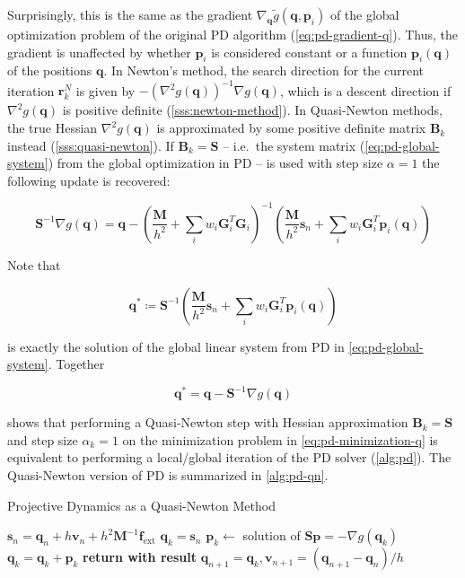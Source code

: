 Surprisingly, this is the same as the gradient $\nabla_{\bm{q}} \tilde{g}(\bm{q}, \bm{p}_i)$ of the global optimization problem of the original
PD algorithm (\cref{eq:pd-gradient-q}). Thus, the gradient is unaffected by whether $\bm{p}_i$ is considered constant or a function
$\bm{p}_i(\bm{q})$ of the positions $\bm{q}$. In Newton's method, the search direction for the current iteration $\bm{r}^N_k$ is given
by $-(\nabla^2 g(\bm{q}))^{-1} \nabla g(\bm{q})$, which is a descent direction if $\nabla^2 g(\bm{q})$ is positive definite 
(\cref{sss:newton-method}). In Quasi-Newton methods, the true Hessian $\nabla^2 g(\bm{q})$ is approximated by some positive definite matrix $\bm{B}_k$ 
instead (\cref{sss:quasi-newton}). If $\bm{B}_k = \bm{S}$ -- i.e.\ the system matrix 
(\cref{eq:pd-global-system}) from the global optimization in PD -- is used with step size $\alpha = 1$ the following update is recovered:

\[
    \bm{S}^{-1} \nabla g(\bm{q}) = 
    \bm{q} - (\frac{\bm{M}}{h^2} + \sum_i w_i \bm{G}_i^T \bm{G}_i)^{-1} 
    (\frac{\bm{M}}{h^2}\bm{s}_n + \sum_i w_i \bm{G}_i^T \bm{p}_i(\bm{q}))
\]

\noindent Note that 

\[
    \bm{q}^* \coloneqq \bm{S}^{-1} (\frac{\bm{M}}{h^2}\bm{s}_n + \sum_i w_i 
    \bm{G}_i^T \bm{p}_i(\bm{q}))
\]

\noindent is exactly the solution of the global linear system from PD in \cref{eq:pd-global-system}. Together

\[
    \bm{q}^* = \bm{q} -\bm{S}^{-1} \nabla g(\bm{q}) 
\]

\noindent shows that performing a Quasi-Newton step with Hessian approximation $\bm{B}_k = \bm{S}$ and step size 
$\alpha_k = 1$ on the 
minimization problem in \cref{eq:pd-minimization-q} is equivalent to performing a local/global iteration of the PD solver 
(\cref{alg:pd}). The Quasi-Newton version of PD is summarized in \cref{alg:pd-qn}.

\begin{algorithm}
\caption{Projective Dynamics as a Quasi-Newton Method}\label{alg:pd-qn}
\begin{algorithmic}
\State $\bm{s}_n = \bm{q}_n + h\bm{v}_n + h^2\bm{M}^{-1}\bm{f}_{\text{ext}}$
\State $\bm{q}_k = \bm{s}_n$
\State $\bm{p}_k \gets$ solution of $\bm{S}\bm{p} = -\nabla g(\bm{q}_k)$
\State $\bm{q}_k = \bm{q}_k + \bm{p}_k$
\EndFor
\State \textbf{return with result } $\bm{q}_{n+1} = \bm{q}_k, \bm{v}_{n+1} = (\bm{q}_{n+1} - \bm{q}_n)/h$
\EndProcedure
\end{algorithmic}
\end{algorithm}

